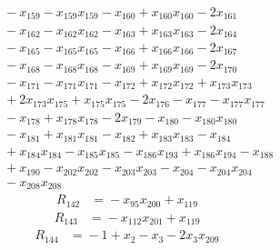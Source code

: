 \begin{align*}
&\quad{}-x_{159} -x_{159}x_{159} -x_{160} +x_{160}x_{160} -2x_{161}\\
&\quad{}-x_{162} -x_{162}x_{162} -x_{163} +x_{163}x_{163} -2x_{164}\\
&\quad{}-x_{165} -x_{165}x_{165} -x_{166} +x_{166}x_{166} -2x_{167}\\
&\quad{}-x_{168} -x_{168}x_{168} -x_{169} +x_{169}x_{169} -2x_{170}\\
&\quad{}-x_{171} -x_{171}x_{171} -x_{172} +x_{172}x_{172} +x_{173}x_{173}\\
&\quad{}+2x_{173}x_{175} +x_{175}x_{175} -2x_{176} -x_{177} -x_{177}x_{177}\\
&\quad{}-x_{178} +x_{178}x_{178} -2x_{179} -x_{180} -x_{180}x_{180}\\
&\quad{}-x_{181} +x_{181}x_{181} -x_{182} +x_{183}x_{183} -x_{184}\\
&\quad{}+x_{184}x_{184} -x_{185}x_{185} -x_{186}x_{193} +x_{186}x_{194} -x_{188}\\
&\quad{}+x_{190} -x_{202}x_{202} -x_{203}x_{203} -x_{204} -x_{204}x_{204}\\
&\quad{}-x_{208}x_{208}
\end{align*}
\begin{align*}
R_{142}&={}-x_{95}x_{200} +x_{119}
\end{align*}
\begin{align*}
R_{143}&={}-x_{112}x_{201} +x_{119}
\end{align*}
\begin{align*}
R_{144}&={}-1 +x_{2} -x_{3} -2x_{3}x_{209}
\end{align*}
